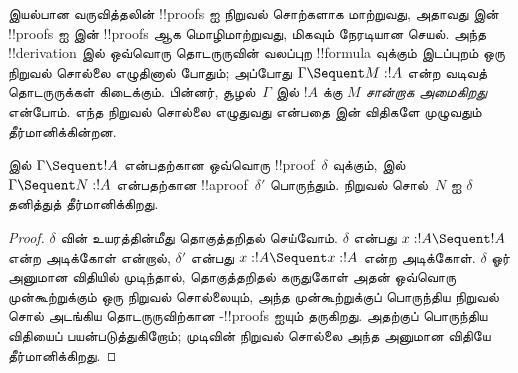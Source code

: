 \documentclass[../../../include/open-logic-section]{subfiles}
\begin{document}


இயல்பான வருவித்தலின் !!{proof}s ஐ நிறுவல் சொற்களாக
மாற்றுவது, அதாவது  இன் !!{proof}s ஐ
 இன் !!{proof}s ஆக மொழிமாற்றுவது,
மிகவும் நேரடியான செயல். அந்த !!{derivation} இல்
ஒவ்வொரு தொடருருவின் வலப்புற !!{formula} வுக்கும்
இடப்புறம் ஒரு நிறுவல் சொல்லை எழுதினால் போதும்;
அப்போது $\Gamma \Sequent M : !A$ என்ற வடிவத்
தொடருருக்கள் கிடைக்கும். பின்னர், சூழல்~$\Gamma$ இல்
$!A$ க்கு $M$ \emph{சான்றாக அமைகிறது} என்போம்.
எந்த நிறுவல் சொல்லை எழுதுவது என்பதை
 இன் விதிகளே முழுவதும் தீர்மானிக்கின்றன.

\begin{prop}
 இல் $\Gamma \Sequent !A$ என்பதற்கான
ஒவ்வொரு !!{proof}~$\delta$ வுக்கும்,  இல்
$\Gamma \Sequent N : !A$ என்பதற்கான !!a{proof}~$\delta'$
பொருந்தும். நிறுவல் சொல்~$N$ ஐ $\delta$ தனித்துத்
தீர்மானிக்கிறது.
\end{prop}

\begin{proof}
$\delta$ வின் உயரத்தின்மீது தொகுத்தறிதல் செய்வோம்.
$\delta$ என்பது $x:!A \Sequent !A$ என்ற அடிக்கோள்
என்றால், $\delta'$ என்பது $x:!A \Sequent x:!A$
என்ற அடிக்கோள். $\delta$ ஓர் அனுமான விதியில் முடிந்தால்,
தொகுத்தறிதல் கருதுகோள் அதன் ஒவ்வொரு முன்கூற்றுக்கும்
ஒரு நிறுவல் சொல்லையும், அந்த முன்கூற்றுக்குப் பொருந்திய
நிறுவல் சொல் அடங்கிய தொடருருவிற்கான
-!!{proof}s ஐயும் தருகிறது. அதற்குப்
பொருந்திய  விதியைப் பயன்படுத்துகிறோம்;
முடிவின் நிறுவல் சொல்லை அந்த  அனுமான
விதியே தீர்மானிக்கிறது.
\end{proof}
\end{document}
